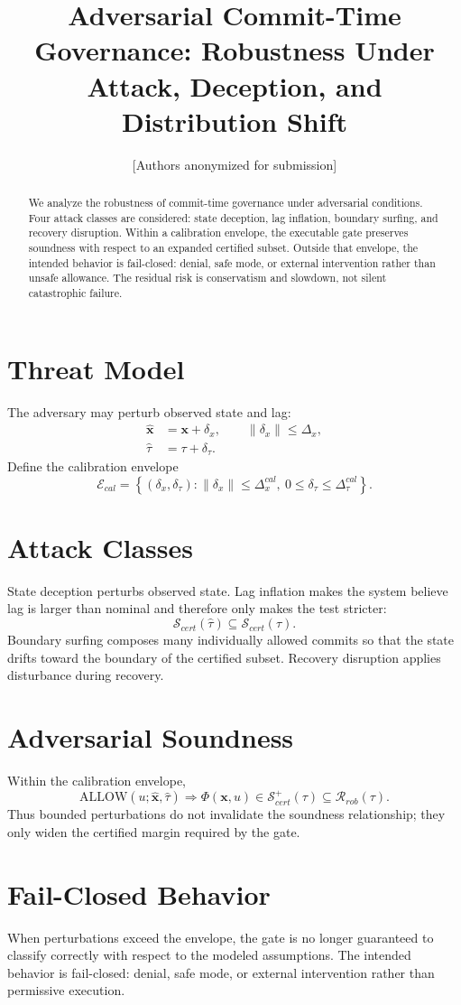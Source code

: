 \documentclass[letterpaper,10pt,conference]{ieeeconf}
\title{\bf Adversarial Commit-Time Governance: Robustness Under Attack, Deception, and Distribution Shift}
\author{[Authors anonymized for submission]}
\newcommand{\x}{\mathbf{x}}
\newcommand{\Rrob}{\mathcal{R}_{rob}}
\newcommand{\Scert}{\mathcal{S}_{cert}}
\newcommand{\Phiop}{\Phi}
\begin{document}
\maketitle
\thispagestyle{empty}
\pagestyle{empty}
\begin{abstract}
We analyze the robustness of commit-time governance under adversarial conditions. Four attack classes are considered: state deception, lag inflation, boundary surfing, and recovery disruption. Within a calibration envelope, the executable gate preserves soundness with respect to an expanded certified subset. Outside that envelope, the intended behavior is fail-closed: denial, safe mode, or external intervention rather than unsafe allowance. The residual risk is conservatism and slowdown, not silent catastrophic failure.
\end{abstract}
\section{Threat Model}
The adversary may perturb observed state and lag:
\begin{align}
\hat{\x} &= \x+\delta_x,\qquad \|\delta_x\|\le \Delta_x,\\
\hat\tau &= \tau+\delta_\tau.
\end{align}
Define the calibration envelope
\[
\mathcal{E}_{cal}=\left\{(\delta_x,\delta_\tau):\|\delta_x\|\le \Delta_x^{cal},\ 0\le \delta_\tau\le \Delta_\tau^{cal}\right\}.
\]
\section{Attack Classes}
State deception perturbs observed state. Lag inflation makes the system believe lag is larger than nominal and therefore only makes the test stricter:
\[
\Scert(\hat\tau)\subseteq \Scert(\tau).
\]
Boundary surfing composes many individually allowed commits so that the state drifts toward the boundary of the certified subset. Recovery disruption applies disturbance during recovery.
\section{Adversarial Soundness}
Within the calibration envelope,
\[
\mathrm{ALLOW}(u;\hat{\x},\hat\tau)\Rightarrow \Phiop(\x,u)\in \Scert^+(\tau)\subseteq \Rrob(\tau).
\]
Thus bounded perturbations do not invalidate the soundness relationship; they only widen the certified margin required by the gate.
\section{Fail-Closed Behavior}
When perturbations exceed the envelope, the gate is no longer guaranteed to classify correctly with respect to the modeled assumptions. The intended behavior is fail-closed: denial, safe mode, or external intervention rather than permissive execution.
\end{document}
